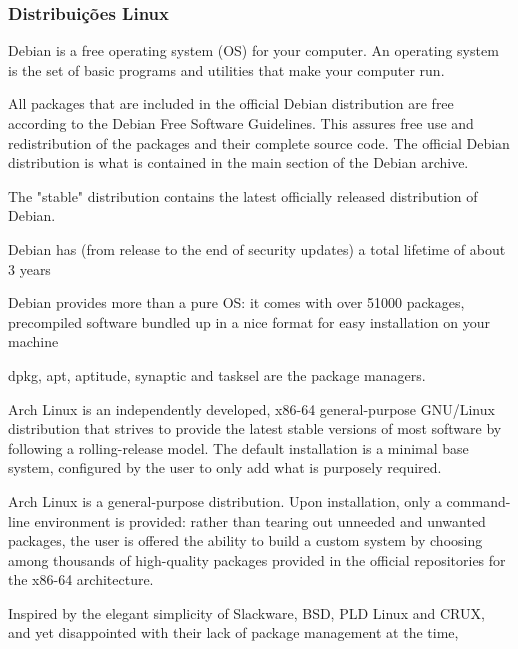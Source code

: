 \documentclass[
	article,			%
	12pt,				%
	openright,			%
	oneside,			%
	a4paper,			%
	chapter=TITLE,		%
	section=TITLE,		%
	subsection=TITLE,	%
	subsubsection=TITLE,%
	subsubsubsection=TITLE, %
	english,			%
	brazil,				%
	]{abntex2}
\begin{document}
\cite{Nunes2009}

\subsubsection{Distribuições Linux}

Debian is a free operating system (OS) for your computer. An operating system is the set of basic programs and utilities that make your computer run. 

All packages that are included in the official Debian distribution are free according to the Debian Free Software Guidelines. This assures free use and redistribution of the packages and their complete source code. The official Debian distribution is what is contained in the main section of the Debian archive.

The "stable" distribution contains the latest officially released distribution of Debian. 

Debian has (from release to the end of security updates) a total lifetime of about 3 years

Debian provides more than a pure OS: it comes with over 51000 packages, precompiled software bundled up in a nice format for easy installation on your machine

\cite{Debian2018}

dpkg, apt, aptitude, synaptic and tasksel are the package managers.

\cite{Debian2016}


Arch Linux is an independently developed, x86-64 general-purpose GNU/Linux distribution that strives to provide the latest stable versions of most software by following a rolling-release model. The default installation is a minimal base system, configured by the user to only add what is purposely required.

Arch Linux is a general-purpose distribution. Upon installation, only a command-line environment is provided: rather than tearing out unneeded and unwanted packages, the user is offered the ability to build a custom system by choosing among thousands of high-quality packages provided in the official repositories for the x86-64 architecture.

Inspired by the elegant simplicity of Slackware, BSD, PLD Linux and CRUX, and yet disappointed with their lack of package management at the time,

\cite{ArchWiki2018a}
\end{document}
